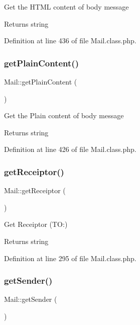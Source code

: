Get the H\+T\+ML content of body message

\begin{DoxyReturn}{Returns}
string 
\end{DoxyReturn}


Definition at line 436 of file Mail.\+class.\+php.

\hypertarget{classMail_ac1a5a2b325a14e6331f13d2b2b18d9f8}{}\label{classMail_ac1a5a2b325a14e6331f13d2b2b18d9f8} 
\subsubsection{\texorpdfstring{get\+Plain\+Content()}{getPlainContent()}}
{\footnotesize\ttfamily Mail\+::get\+Plain\+Content (\begin{DoxyParamCaption}{ }\end{DoxyParamCaption})}

Get the Plain content of body message

\begin{DoxyReturn}{Returns}
string 
\end{DoxyReturn}


Definition at line 426 of file Mail.\+class.\+php.

\hypertarget{classMail_ae334a42923b5cd5d4c7012ba944c3841}{}\label{classMail_ae334a42923b5cd5d4c7012ba944c3841} 
\subsubsection{\texorpdfstring{get\+Receiptor()}{getReceiptor()}}
{\footnotesize\ttfamily Mail\+::get\+Receiptor (\begin{DoxyParamCaption}{ }\end{DoxyParamCaption})}

Get Receiptor (TO\+:)

\begin{DoxyReturn}{Returns}
string 
\end{DoxyReturn}


Definition at line 295 of file Mail.\+class.\+php.

\hypertarget{classMail_a25c8d959a398cdfe3919d9fd634358d7}{}\label{classMail_a25c8d959a398cdfe3919d9fd634358d7} 
\subsubsection{\texorpdfstring{get\+Sender()}{getSender()}}
{\footnotesize\ttfamily Mail\+::get\+Sender (\begin{DoxyParamCaption}{ }\end{DoxyParamCaption})}

